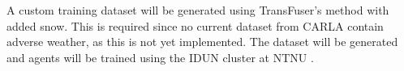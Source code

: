A custom training dataset will be generated using TransFuser's method with added snow.
This is required since no current dataset from CARLA contain adverse weather,
as this is not yet implemented.
The dataset will be generated and agents will be trained using the IDUN cluster at NTNU \cite{sjalander+:2019epic}.

